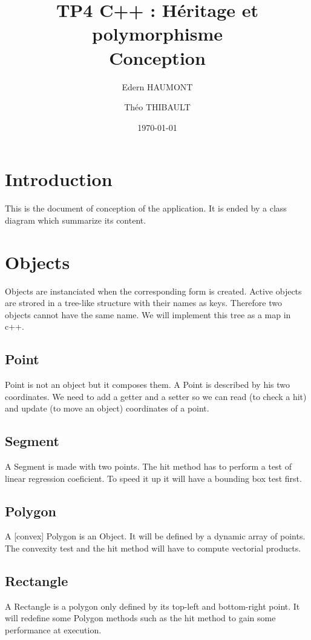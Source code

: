 \documentclass[a4paper, 12pts]{article}
\title{TP4 C++ : Héritage et polymorphisme \\
    \large Conception}
\author{Edern HAUMONT}
\author{Théo THIBAULT}
\affil{B3133}
\date{\today}
\begin{document}

\maketitle



\section{Introduction}
	This is the document of conception of the application. It is ended by a class diagram which summarize its content.

\section{Objects}
    Objects are instanciated when the corresponding form is created. Active objects are strored in a tree-like structure with their names as keys. Therefore two objects cannot have the same name. We will implement this tree as a map in c++.
    \subsection{Point}
        Point is not an object but it composes them. A Point is described by his two coordinates. We need to add a getter and
        a setter so we can read (to check a hit) and update (to move an object) coordinates of a point.
    \subsection{Segment}
        A Segment is made with two points. The hit method has to perform a test of linear regression coeficient. To speed it up it will have a bounding box test first.
    \subsection{Polygon}
	A [convex] Polygon is an Object. It will be defined by a dynamic array of points. The convexity test and the hit method will have to compute vectorial products.
    \subsection{Rectangle}
	A Rectangle is a polygon only defined by its top-left and bottom-right point. It will redefine some Polygon methods such as the hit method to gain some performance at execution.
\end{document}
